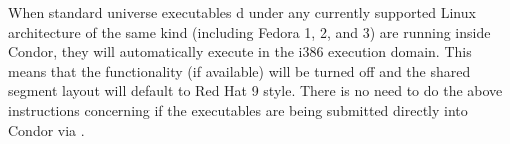 When standard universe executables d under any currently
supported Linux architecture of the same kind (including Fedora 1,
2, and 3) are running inside Condor, they will automatically execute
in the i386 execution domain. This means that the 
functionality (if available) will be turned off and the shared segment
layout will default to Red Hat 9 style. There is no need to do the
above instructions concerning  if the executables are
being submitted directly into Condor via .





